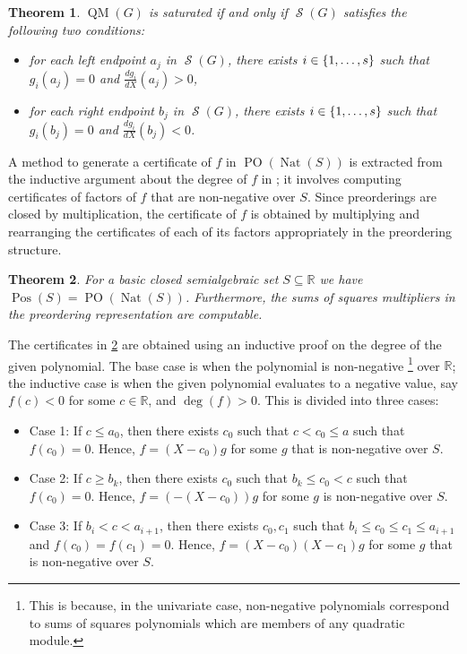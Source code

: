 \documentclass[preprint,12pt,authoryear]{elsarticle}
\newtheorem{theorem}{Theorem}[section]
\DeclarePairedDelimiter{\set}{\lbrace}{\rbrace}
\DeclareMathOperator{\semialgebraic}{\mathcal{S}}
\DeclareMathOperator{\Nat}{Nat}
\DeclareMathOperator{\PO}{PO}
\DeclareMathOperator{\QM}{QM}
\DeclareMathOperator{\Pos}{Pos}
\begin{document}
\begin{theorem}\cite[Theorem 3.2]{marshall2005}
  \th\label{sec:cert-elem-ponats-2} $\QM(G)$ is saturated if and only if
  $\semialgebraic(G)$ satisfies the following two conditions:
  \begin{itemize}
  \item[(i)] for each left endpoint $a_{j}$ in $\semialgebraic(G)$, there exists
    $i \in \set{1, \dots, s}$ such that $g_i(a_j) = 0$ and
    $\frac{d g_i}{dX}(a_j) > 0$,
  \item[(ii)] for each right endpoint $b_j$ in $\semialgebraic(G)$, there exists
    $i \in \set{1, \dots, s}$ such that $g_i(b_j) = 0$ and
    $\frac{d g_i}{dX}(b_j) < 0$.
  \end{itemize}
\end{theorem}

A method to generate a certificate of $f$ in $\PO(\Nat(S))$ is extracted
from the inductive argument about the degree of $f$ in \cite{Augustin2008TheMP};
it involves computing certificates of factors of $f$ that are non-negative over
$S$. Since preorderings are closed by multiplication, the certificate of $f$ is
obtained by multiplying and rearranging the certificates of each of its factors
appropriately in the preordering structure.

\begin{theorem}\cite[Theorem 1.6]{Augustin2008TheMP}
  \th\label{sec:background} For a basic closed semialgebraic set
  $S \subseteq \mathbb{R}$ we have $\Pos(S) = \PO(\Nat(S))$. Furthermore, the
  sums of squares multipliers in the preordering representation are computable.
\end{theorem}

The certificates in \th\ref{sec:background} are obtained using an inductive
proof on the degree of the given polynomial. The base case is when the
polynomial is non-negative \footnote{This is because, in the univariate case,
  non-negative polynomials correspond to sums of squares polynomials which are
  members of any quadratic module.} over $\mathbb{R}$; the inductive case is
when the given polynomial evaluates to a negative value, say $f(c) < 0$ for some
$c \in \mathbb{R}$, and $\deg(f) > 0$. This is divided into three cases:

\begin{itemize}
\item Case 1: If $c \leq a_0$, then there exists $c_0$ such that
  $c < c_0 \leq a$ such that $f(c_0) = 0$. Hence, $f = (X-c_0)g$ for some $g$
  that is non-negative over $S$.
\item Case 2: If $c \geq b_k$, then there exists $c_0$ such that
  $b_k \leq c_0 < c$ such that $f(c_0) = 0$. Hence, $f = (-(X-c_0)) g$ for some
  $g$ is non-negative over $S$.
\item Case 3: If $b_i < c < a_{i+1}$, then there exists $c_0, c_1$ such that
  $b_i \leq c_0 \leq c_1 \leq a_{i+1}$ and $f(c_0) = f(c_1) = 0$. Hence,
  $f = (X-c_0)(X-c_1)g$ for some $g$ that is non-negative over $S$.
\end{itemize}
\end{document}
